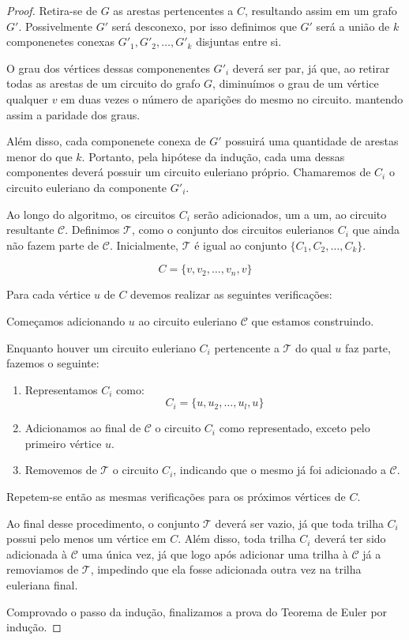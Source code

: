\begin{proof}
Retira-se de $G$ as arestas pertencentes a $C$, resultando assim em um grafo $G'$. 
Possivelmente $G'$ será desconexo, por isso definimos que $G'$ será a união de $k$ componenetes conexas $G'_1, G'_2, \dots, G'_k$ disjuntas entre si.

O grau dos vértices dessas componenentes $G'_i$ deverá ser par, já que, ao retirar todas as arestas de um circuito do grafo $G$, diminuímos o grau de um vértice qualquer $v$ em duas vezes o número de aparições do mesmo no circuito. mantendo assim a paridade dos graus. 

Além disso, cada componenete conexa de $G'$ possuirá uma quantidade de arestas menor do que $k$.
Portanto, pela hipótese da indução, cada uma dessas componentes deverá possuir um circuito euleriano próprio. 
Chamaremos de $C_i$ o circuito euleriano da componente $G'_i$.

\sloppy Ao longo do algoritmo, os circuitos $C_i$ serão adicionados, um a um, ao circuito resultante $\mathcal{C}$. 
Definimos $\mathcal{T}$, como o conjunto dos circuitos eulerianos $C_i$ que ainda não fazem parte de $\mathcal{C}$. 
Inicialmente, $\mathcal{T}$ é igual ao conjunto $\{C_1, C_2, \dots, C_k\}$.


\[
	C = \{v, v_2, \dots, v_n, v\}
\]

Para cada vértice $u$ de $C$ devemos realizar as seguintes verificações:

\begin{tcolorbox}

Começamos adicionando $u$ ao circuito euleriano $\mathcal{C}$ que estamos construindo.

Enquanto houver um circuito euleriano $C_i$ pertencente a $\mathcal{T}$ do qual $u$ faz parte, fazemos o seguinte:


\begin{enumerate}
    \item Representamos $C_i$ como: 
    \[
        C_i = \{u, u_2, \dots, u_l, u\}
    \]

\item Adicionamos ao final de $\mathcal{C}$ o circuito $C_i$ como representado, exceto pelo primeiro vértice $u$. 

\item Removemos de $\mathcal{T}$ o circuito $C_i$, indicando que o mesmo já foi adicionado a $\mathcal{C}$.

\end{enumerate}

Repetem-se então as mesmas verificações para os próximos vértices de $C$.
\end{tcolorbox}


Ao final desse procedimento, o conjunto $\mathcal{T}$ deverá ser vazio, já que toda trilha $C_i$ possui pelo menos um vértice em $C$. Além disso, toda trilha $C_i$ deverá ter sido adicionada à $\mathcal{C}$ uma única vez, já que logo após adicionar uma trilha à $\mathcal{C}$ já a removiamos de $\mathcal{T}$, impedindo que ela fosse adicionada outra vez na trilha euleriana final.

Comprovado o passo da indução, finalizamos a prova do Teorema de Euler por indução.

\end{proof}

